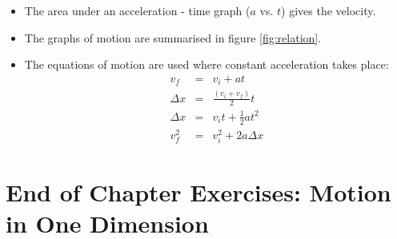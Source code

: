 \begin{itemize}
\item The area under an acceleration - time graph ($a$ vs. $t$) gives the velocity.
\item The graphs of motion are summarised in figure \ref{fig:relation}.
\item{The equations of motion are used where constant acceleration takes place:
\begin{eqnarray*}
v_f &=& v_i + at\\
\Delta x &=& \frac{(v_i + v_f)}{2} t\\
\Delta x &=& v_it + \frac{1}{2}at^2\\
v_f^2 &=& v_i^2 + 2a \Delta x
\end{eqnarray*}}
\end{itemize}

\section{End of Chapter Exercises: Motion in One Dimension}
